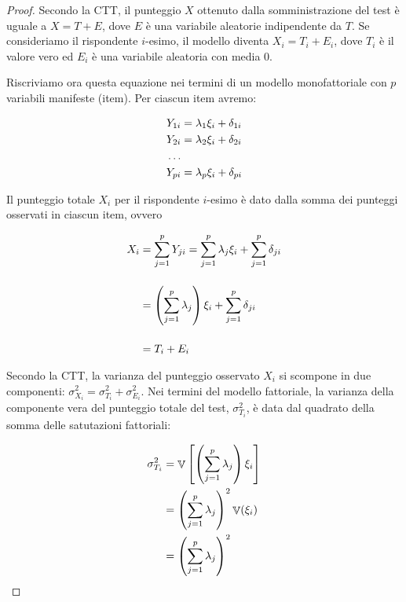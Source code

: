 \documentclass[
  11pt,
]{krantz}
\DeclareMathOperator{\V}{\mathbb{V}} %
\theoremstyle{definition}
\theoremstyle{definition}
\theoremstyle{definition}
\theoremstyle{definition}
\theoremstyle{remark}
\begin{document}
\begin{proof}
Secondo la CTT, il punteggio \(X\) ottenuto dalla somministrazione del test è uguale a \(X = T + E\), dove \(E\) è una variabile aleatorie indipendente da \(T\). Se consideriamo il rispondente \(i\)-esimo, il modello diventa \(X_i = T_i + E_i\), dove \(T_i\) è il valore vero ed \(E_i\) è una variabile aleatoria con media 0.

Riscriviamo ora questa equazione nei termini di un modello monofattoriale con \(p\) variabili manifeste (item). Per ciascun item avremo:

\begin{equation}
\begin{aligned}
 Y_{1i} &=  \lambda_1 \xi_i + \delta_{1i} \notag\\
 Y_{2i} &=  \lambda_2 \xi_i + \delta_{2i} \notag\\
  \dots\notag\\
 Y_{pi} &=  \lambda_p \xi_i + \delta_{pi} \notag\end{aligned}
 \end{equation}

Il punteggio totale \(X_i\) per il rispondente \(i\)-esimo è dato dalla somma dei punteggi osservati in ciascun item, ovvero

\begin{equation}
\begin{aligned}
 X_i &= \sum_{j=1}^p Y_{ji} = \sum_{j=1}^p \lambda_j \xi_i + \sum_{j=1}^p \delta_{ji}\notag\\[12pt]
  &=  \left( \sum_{j=1}^p \lambda_j \right) \xi_i  +  \sum_{j=1}^p \delta_{ji} \notag\\[12pt]
  &= T_i + E_i\notag
\end{aligned}
\end{equation}

Secondo la CTT, la varianza del punteggio osservato \(X_i\) si scompone in due componenti: \(\sigma^2_{X_i} = \sigma^2_{T_i} + \sigma^2_{E_i}\). Nei termini del modello fattoriale, la varianza della componente vera del punteggio totale del test, \(\sigma^2_{T_i}\), è data dal quadrato della somma delle satutazioni fattoriali:

\begin{equation}
\begin{aligned}
 \sigma^2_{T_i} &= \V\left[ \left( \sum_{j=1}^p \lambda_j \right) \xi_i \right]\notag\\
 &= \left( \sum_{j=1}^p \lambda_j \right)^2 \V(\xi_i)\notag\\
 &= \left( \sum_{j=1}^p \lambda_j \right)^2 \notag
\end{aligned}
\end{equation}


\end{proof}
\end{document}
